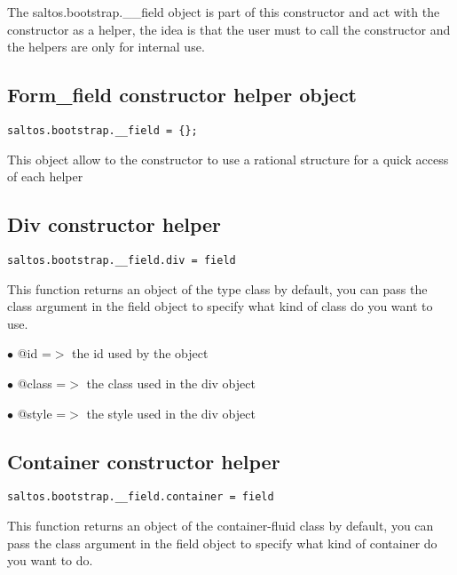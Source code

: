 \documentclass[a4paper]{book}
\begin{document}
The saltos.bootstrap.\_\_field object is part of this constructor and act with the constructor
as a helper, the idea is that the user must to call the constructor and the helpers are
only for internal use.

\hypertarget{toc430}{}
\subsection{Form\_field constructor helper object}

\begin{lstlisting}
saltos.bootstrap.__field = {};
\end{lstlisting}

This object allow to the constructor to use a rational structure for a quick access of each helper

\hypertarget{toc431}{}
\subsection{Div constructor helper}

\begin{lstlisting}
saltos.bootstrap.__field.div = field
\end{lstlisting}

This function returns an object of the type class by default, you can pass the class
argument in the field object to specify what kind of class do you want to use.

\begin{compactitem}
\item[\color{myblue}$\bullet$] @id    =$>$ the id used by the object
\item[\color{myblue}$\bullet$] @class =$>$ the class used in the div object
\item[\color{myblue}$\bullet$] @style =$>$ the style used in the div object
\end{compactitem}

\hypertarget{toc432}{}
\subsection{Container constructor helper}

\begin{lstlisting}
saltos.bootstrap.__field.container = field
\end{lstlisting}

This function returns an object of the container-fluid class by default, you can pass the class
argument in the field object to specify what kind of container do you want to do.
\end{document}
